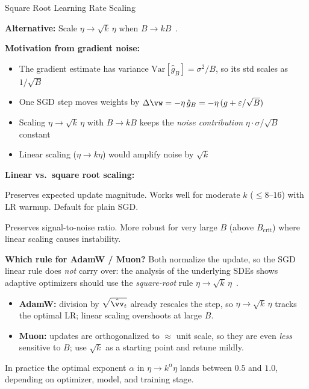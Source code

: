 \begin{frame}{Square Root Learning Rate Scaling}

  \textbf{Alternative:} Scale $\eta \to \sqrt{k}\,\eta$ when $B \to kB$~\cite{hoffer2017train}.

  \vspace{0.3em}
  \textbf{Motivation from gradient noise:}
  \begin{itemize}
    \item The gradient estimate has variance $\text{Var}[\hat{g}_B] = \sigma^2 / B$, so its std scales as $1/\sqrt{B}$
    \item One SGD step moves weights by $\Delta \vw = -\eta\, \hat{g}_B = -\eta\,(g + \varepsilon/\sqrt{B})$
    \item Scaling $\eta \to \sqrt{k}\,\eta$ with $B \to kB$ keeps the \emph{noise contribution} $\eta \cdot \sigma / \sqrt{B}$ constant
    \item Linear scaling ($\eta \to k\eta$) would amplify noise by $\sqrt{k}$
  \end{itemize}

  \vspace{0.3em}
  \textbf{Linear vs.\ square root scaling:}
  \begin{description}[labelwidth=\widthof{\bfseries Square root~~}, leftmargin=!]
    \item[Linear] Preserves expected update magnitude. Works well for moderate $k$ ($\leq 8$--$16$) with LR warmup. Default for plain SGD.
    \item[Square root] Preserves signal-to-noise ratio. More robust for very large $B$ (above $B_\text{crit}$) where linear scaling causes instability.
  \end{description}

  \vspace{0.3em}
  \textbf{Which rule for AdamW / Muon?} Both normalize the update, so the SGD linear rule does \emph{not} carry over: the analysis of the underlying SDEs shows adaptive optimizers should use the \emph{square-root} rule $\eta \to \sqrt{k}\,\eta$~\cite{malladi2022sde}.
  \begin{itemize}
    \item \textbf{AdamW:} division by $\sqrt{\hat{\vv}_t}$ already rescales the step, so $\eta \to \sqrt{k}\,\eta$ tracks the optimal LR; linear scaling overshoots at large $B$.
    \item \textbf{Muon:} updates are orthogonalized to $\approx$ unit scale, so they are even \emph{less} sensitive to $B$; use $\sqrt{k}$ as a starting point and retune mildly.
  \end{itemize}
  In practice the optimal exponent $\alpha$ in $\eta \to k^\alpha \eta$ lands between $0.5$ and $1.0$, depending on optimizer, model, and training stage.

\end{frame}

